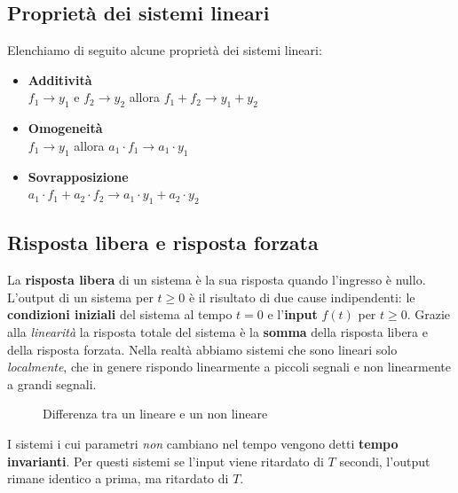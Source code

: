 \documentclass[a4paper, titlepage, oneside]{scrbook}
\begin{document}
\subsection{Proprietà dei sistemi lineari}
Elenchiamo di seguito alcune proprietà dei sistemi lineari:
\begin{itemize}
	\item \textbf{Additività}\\
	$f_{1} \rightarrow y_{1}$ e $f_{2} \rightarrow y_{2}$ allora $f_{1} +f_{2} \rightarrow y_{1}+y_{2}$
	\item \textbf{Omogeneità}\\
	$f_{1} \rightarrow y_{1}$ allora $a_{1} \cdot f_{1}\rightarrow a_{1}\cdot y_{1}$
	\item \textbf{Sovrapposizione}\\
	$a_{1} \cdot f_{1} + a_{2}\cdot f_{2} \rightarrow a_{1}\cdot y_{1}+a_{2}\cdot y_{2}$
\end{itemize}

\subsection{Risposta libera e risposta forzata}
La \textbf{risposta libera} di un sistema è la sua risposta quando l'ingresso è nullo.
L'output di un sistema per $t\geq0$ è il risultato di due cause indipendenti: le \textbf{condizioni iniziali} del sistema al tempo $t=0$ e l'\textbf{input} $f(t)$ per $t\geq0$.
Grazie alla \textit{linearità} la risposta totale del sistema è la \textbf{somma} della risposta libera e della risposta forzata.
Nella realtà abbiamo sistemi che sono lineari solo \textit{localmente}, che in genere rispondo linearmente a piccoli segnali e non linearmente a grandi segnali.
\begin{figure}[h]
	\centering
	\caption{Differenza tra un lineare e un non lineare}
	\label{fig:lineare_vs_nonlineare}
\end{figure}

I sistemi i cui parametri \textit{non} cambiano nel tempo vengono detti \textbf{tempo invarianti}.
Per questi sistemi se l'input viene ritardato di $T$ secondi, l'output rimane identico a prima, ma ritardato di $T$.
\end{document}
